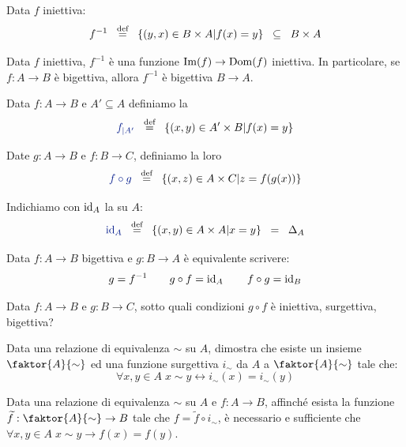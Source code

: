 \begin{definition}
	Data $f$ iniettiva:
	\[ f^{-1} \;\;\overset{\text{def}}{=}\;\; \{(y,x) \in B \times A | f(x) = y\}
\;\;\subseteq\;\; B \times A
		\]
\end{definition}

\begin{remark}
	Data $f$ iniettiva, $f^{-1}$ \`e una funzione $\operatorname{Im}(f) \to
\operatorname{Dom}(f)$ iniettiva.
	In particolare, se $f \colon A \to B$ \`e bigettiva, allora
$f^{-1}$ \`e bigettiva $B\to A$.
\end{remark}

\begin{definition}
	Data $f: A \rightarrow B$ e $A' \subseteq A$ definiamo la
	\[ {\drkblu f_{|A'}} \;\;\Mydef\;\; \{(x,y) \in A' \times B | f(x) = y\}
		\]
\end{definition}

\begin{definition}
	Date $g : A \rightarrow B$ e $f : B \rightarrow C$, definiamo la
loro 
	\[ {\drkblu f \circ g} \;\;\Mydef\;\; \{(x,z) \in A \times C | z =
f(g(x))\} \]
\end{definition}

\begin{notation}
	Indichiamo con $\operatorname{id}_A$ la  su $A$:
	\[ {\drkblu \id_A} \;\;\Mydef\;\; \{(x,y) \in A \times A | x = y\}
\;\;=\;\; \Delta_A
		\]
\end{notation}

\begin{remark}
	Data $f : A \rightarrow B$ bigettiva e $g : B \rightarrow A$ \`e equivalente scrivere:
	\[ g = f^{-1} \qquad g \circ f = \operatorname{id}_A \qquad f \circ g = \operatorname{id}_B
		\]
\end{remark}

\begin{exercise}
	Data $f\colon A \to B$ e $g: B \rightarrow C$, sotto quali condizioni $g \circ f$ \`e iniettiva, surgettiva, bigettiva?
\end{exercise}

\begin{exercise}
	\label{3.73}
	Data una relazione di equivalenza $\sim$ su $A$, dimostra che esiste un insieme $\faktor{A}{\sim}$ ed una funzione surgettiva $i_\sim$ da $A$ a $\faktor{A}{\sim}$
	tale che:
	\[ \forall x,y \in A \; x \sim y \leftrightarrow i_\sim(x) = i_\sim(y)
		\]
\end{exercise}


\begin{exercise}
	Data una relazione di equivalenza $\sim$ su $A$ e $f : A \rightarrow B$, affinch\'e esista la funzione $\widetilde{f}: \faktor{A}{\sim} \rightarrow B$ tale che $f = \widetilde{f} \circ i_\sim$,
	\`e necessario e sufficiente che $\forall x,y \in A \; x \sim y \rightarrow f(x) = f(y)$.
\end{exercise}
